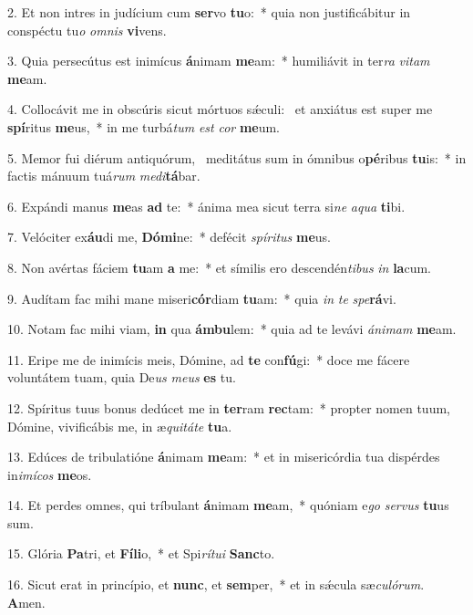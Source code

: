 2. Et non intres in judícium cum \textbf{ser}vo \textbf{tu}o:~*  quia non justificábitur in conspéctu tu\textit{o} \textit{om}\textit{nis} \textbf{vi}vens.\

3. Quia persecútus est inimícus \textbf{á}nimam \textbf{me}am:~*  humiliávit in ter\textit{ra} \textit{vi}\textit{tam} \textbf{me}am.\

4. Collocávit me in obscúris sicut mórtuos sǽculi: \dag\  et anxiátus est super me \textbf{spí}ritus \textbf{me}us,~*  in me turbá\textit{tum} \textit{est} \textit{cor} \textbf{me}um.\

5. Memor fui diérum antiquórum, \dag\  meditátus sum in ómnibus o\textbf{pé}ribus \textbf{tu}is:~*  in factis mánuum tuá\textit{rum} \textit{me}\textit{di}\textbf{tá}bar.\

6. Expándi manus \textbf{me}as \textbf{ad} te:~*  ánima mea sicut terra si\textit{ne} \textit{a}\textit{qua} \textbf{ti}bi.\

7. Velóciter ex\textbf{áu}di me, \textbf{Dó}\textbf{mi}ne:~*  defécit \textit{spí}\textit{ri}\textit{tus} \textbf{me}us.\

8. Non avértas fáciem \textbf{tu}am \textbf{a} me:~*  et símilis ero descendén\textit{ti}\textit{bus} \textit{in} \textbf{la}cum.\

9. Audítam fac mihi mane miseri\textbf{cór}diam \textbf{tu}am:~*  quia \textit{in} \textit{te} \textit{spe}\textbf{rá}vi.\

10. Notam fac mihi viam, \textbf{in} qua \textbf{ám}\textbf{bu}lem:~*  quia ad te levávi \textit{á}\textit{ni}\textit{mam} \textbf{me}am.\

11. Eripe me de inimícis meis, Dómine, ad \textbf{te} con\textbf{fú}gi:~*  doce me fácere voluntátem tuam, quia De\textit{us} \textit{me}\textit{us} \textbf{es} tu.\

12. Spíritus tuus bonus dedúcet me in \textbf{ter}ram \textbf{rec}tam:~*  propter nomen tuum, Dómine, vivificábis me, in æ\textit{qui}\textit{tá}\textit{te} \textbf{tu}a.\

13. Edúces de tribulatióne \textbf{á}nimam \textbf{me}am:~*  et in misericórdia tua dispérdes in\textit{i}\textit{mí}\textit{cos} \textbf{me}os.\

14. Et perdes omnes, qui tríbulant \textbf{á}nimam \textbf{me}am,~*  quóniam e\textit{go} \textit{ser}\textit{vus} \textbf{tu}us sum.\

15. Glória \textbf{Pa}tri, et \textbf{Fí}\textbf{li}o,~*  et Spi\textit{rí}\textit{tu}\textit{i} \textbf{Sanc}to.\

16. Sicut erat in princípio, et \textbf{nunc}, et \textbf{sem}per,~*  et in sǽcula sæ\textit{cu}\textit{ló}\textit{rum}. \textbf{A}men.\

